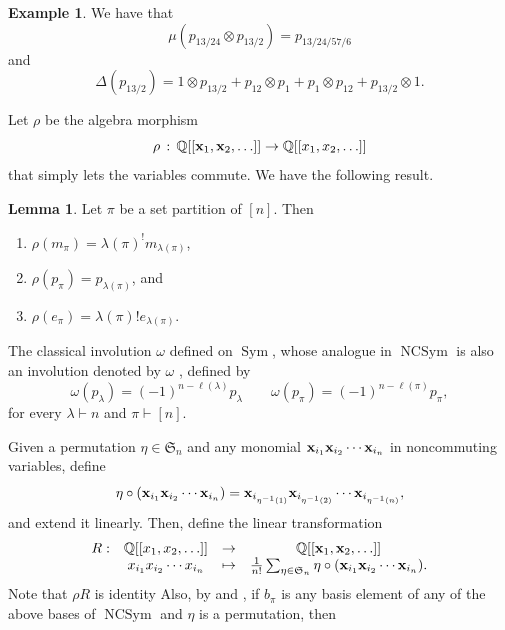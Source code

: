 \documentclass[12pt]{amsart}  %
\theoremstyle{definition}
\newtheorem{lemma}[theorem]{Lemma}
\newtheorem{example}[theorem]{Example}
\theoremstyle{remark}
\numberwithin{equation}{section}
\newcommand{\bbQ}{\mathbb{Q}}
\newcommand{\suchthat}{\,:\,}
\newcommand{\Sym}{\ensuremath{\operatorname{Sym}}}
\newcommand{\NCSym}{\ensuremath{\operatorname{NCSym}}}
\newcommand{\bx}{\text{\bf x}}
\newcommand{\pnc}{{p}}                %
\newcommand\svw[1]{{\color{black}{#1}}}
\begin{document}
\begin{example}
We have that 
$$\mu(p_{13/24}\otimes p_{13/2})=p_{13/24/57/6}$$ and 
$$\Delta(p_{13/2})=1\otimes p_{13/2} +p_{12}\otimes p_{1}+p_{1}\otimes p_{12}+p_{13/2}\otimes 1.$$
\end{example}




Let $\rho$ be the algebra morphism
$$\rho \suchthat \bbQ [[ \bx_1, \bx_2, \ldots ]] \rightarrow \bbQ [[ x_1, x_2, \ldots ]]$$ that simply lets the variables commute. We have the following result.

\begin{lemma}\label{lem:RSrho} \cite[Theorem 2.1]{RS} Let $\pi$ be a set partition of $[n]$. Then
\begin{enumerate}[1)]
\item $\rho(m_\pi) = \lambda (\pi) ^! m_{\lambda(\pi)}$,
\item $\rho(p_\pi) = p_{\lambda(\pi)}$, and
\item $\rho(e_\pi) = \lambda (\pi)! e_{\lambda(\pi)}$.
\end{enumerate}
\end{lemma}

The classical involution $\omega$
defined on $\Sym$, whose analogue in $\NCSym$ is also an involution denoted by $\omega$ \cite[p. 221]{RS}, \svw{is}
defined by
\begin{equation}\label{eq:omega}
\omega(p_\lambda)=(-1)^{n-\ell(\lambda)}p_\lambda \quad \quad \omega(\pnc_\pi)=(-1)^{n-\ell(\pi)}\pnc_\pi,
\end{equation}
for every $\lambda\vdash n$ and $\pi\vdash [n]$.


Given a permutation $\eta\in\mathfrak{S}_n$ and any  monomial $\bx_{i_1}\bx_{i_2}\cdots \bx_{i_n}$ in noncommuting variables, define 
$$\eta\circ (\bx_{i_1}\bx_{i_2}\cdots \bx_{i_n})=\bx_{i_{\eta^{-1}(1)}}\bx_{i_{\eta^{-1}(2)}}\cdots \bx_{i_{\eta^{-1}(n)}},$$ and extend it linearly. Then, define the linear transformation
$$\begin{array}{cccc}
R:& \bbQ [[x_1, x_2, \ldots ]] & \rightarrow& \mathbb{Q} [[ \bx_1, \bx_2, \ldots ]]  \\
& x_{i_1}x_{i_2}\cdots x_{i_n} & \mapsto & \frac{1}{n!}\sum_{\eta\in\mathfrak{S}_n} \eta\circ (\bx_{i_1}\bx_{i_2}\cdots \bx_{i_n}).
\end{array}$$
Note that $\rho R$ is \svw{the} identity \svw{map.} 
Also, by \cite[Equation (4.2)]{DvW} and  \cite[p. 219]{RS}, if $b_\pi$ is any basis element of any of the
above bases of $\NCSym$ and $\eta$ is a permutation, then
\end{document}
